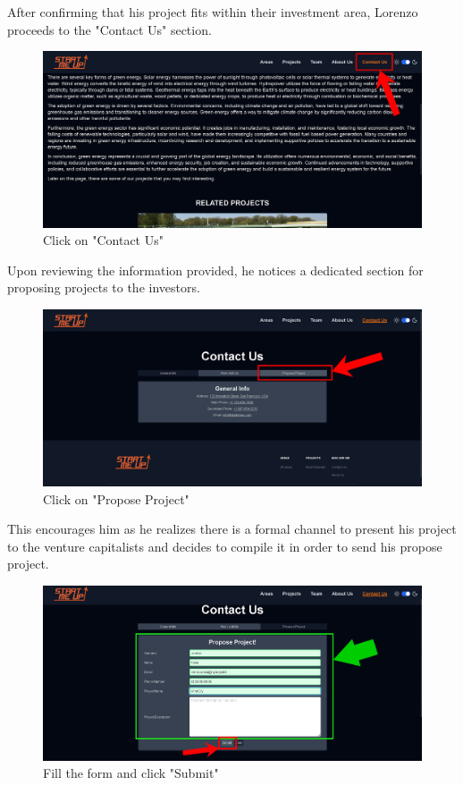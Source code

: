 \documentclass[11pt, letterpaper]{article}
\begin{document}
\noindent
After confirming that his project fits within their investment area, Lorenzo proceeds to the "Contact Us" section.
\begin{figure}[H]
    \centering
    \includegraphics[width=16cm]{images/Scenarios/Scenario 1/Screen6.png}
    \caption{Click on "Contact Us"}
    \label{fig:scenario1_6}
\end{figure}
\noindent
Upon reviewing the information provided, he notices a dedicated section for proposing projects to the investors.
\begin{figure}[H]
    \centering
    \includegraphics[width=16cm]{images/Scenarios/Scenario 1/Screen7.png}
    \caption{Click on "Propose Project"}
    \label{fig:scenario1_7}
\end{figure}
\noindent
This encourages him as he realizes there is a formal channel to present his project to the venture capitalists and decides to compile it in order to send his propose project.
\begin{figure}[H]
    \centering
    \includegraphics[width=16cm]{images/Scenarios/Scenario 1/Screen8.png}
    \caption{Fill the form and click "Submit"}
    \label{fig:scenario1_8}
\end{figure}
\end{document}
